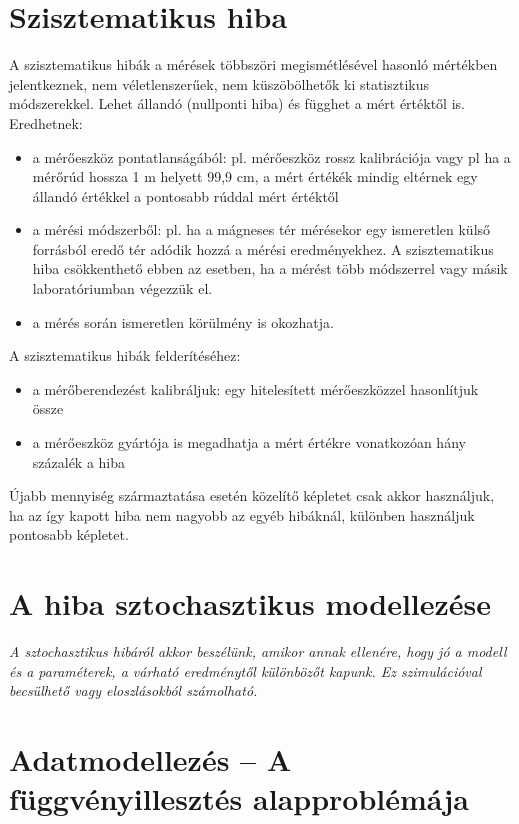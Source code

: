 \documentclass[12pt]{article}
\theoremstyle{plain}
\begin{document}
\section*{Szisztematikus hiba}
A szisztematikus hibák a mérések többszöri megismétlésével hasonló mértékben jelentkeznek, nem véletlenszerűek, nem küszöbölhetők ki statisztikus módszerekkel. Lehet állandó (nullponti hiba) és függhet a mért értéktől is.  Eredhetnek: 
\begin{itemize}
    \item a mérőeszköz pontatlanságából: pl. mérőeszköz rossz kalibrációja vagy pl ha a mérőrúd hossza 1 m helyett 99,9 cm, a mért értékék mindig eltérnek egy állandó értékkel a pontosabb rúddal mért értéktől
    \item a mérési módszerből: pl. ha a mágneses tér mérésekor egy ismeretlen külső forrásból eredő tér adódik hozzá a mérési eredményekhez. A szisztematikus hiba csökkenthető ebben az esetben, ha a mérést több módszerrel vagy másik laboratóriumban végezzük el.
    \item a mérés során ismeretlen körülmény is okozhatja.
\end{itemize}
A szisztematikus hibák felderítéséhez:
\begin{itemize}
    \item a mérőberendezést kalibráljuk: egy hitelesített mérőeszközzel hasonlítjuk össze
    \item a mérőeszköz gyártója is megadhatja a mért értékre vonatkozóan hány százalék a hiba
\end{itemize}
Újabb mennyiség származtatása esetén közelítő képletet csak akkor használjuk, ha az így kapott hiba nem nagyobb az egyéb hibáknál, különben használjuk pontosabb képletet.


\section*{A hiba sztochasztikus modellezése}
\textit{A sztochasztikus hibáról akkor beszélünk, amikor annak ellenére, hogy jó a modell és a paraméterek, a várható eredménytől különbözőt kapunk. Ez szimulációval becsülhető vagy eloszlásokból számolható. 
}

\section*{Adatmodellezés – A függvényillesztés alapproblémája}
\end{document}
